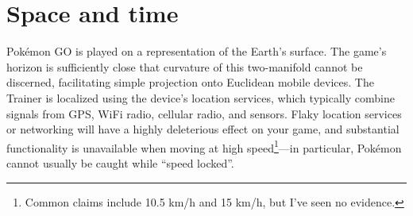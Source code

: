 \chapter{Space and time\label{chap:timespace}}
Pokémon GO is played on a representation of the Earth's surface.
The game's horizon is sufficiently close that curvature of this two-manifold
 cannot be discerned, facilitating simple projection onto Euclidean mobile devices.
The Trainer is localized using the device's location services, which typically
 combine signals from GPS, WiFi radio, cellular radio, and sensors.
Flaky location services or networking will have a highly deleterious effect on your game,
 and substantial functionality is unavailable when moving at high speed\footnote{Common
 claims include 10.5 km/h and 15 km/h, but I've seen no evidence.}---in particular,
 Pokémon cannot usually be caught while ``speed locked''.

